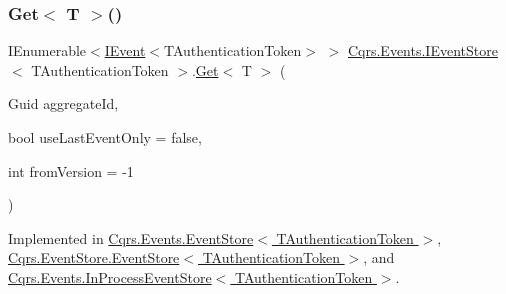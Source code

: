 \mbox{\label{interfaceCqrs_1_1Events_1_1IEventStore_add6227e2978ff8656aad79b1a51bf34c_add6227e2978ff8656aad79b1a51bf34c}} 
\subsubsection{\texorpdfstring{Get$<$ T $>$()}{Get< T >()}}
{\footnotesize\ttfamily I\+Enumerable$<$\hyperlink{interfaceCqrs_1_1Events_1_1IEvent}{I\+Event}$<$T\+Authentication\+Token$>$ $>$ \hyperlink{interfaceCqrs_1_1Events_1_1IEventStore}{Cqrs.\+Events.\+I\+Event\+Store}$<$ T\+Authentication\+Token $>$.\hyperlink{interfaceCqrs_1_1Events_1_1IEventStore_ae02ef6c804d0c4a92705a447bc4b2214_ae02ef6c804d0c4a92705a447bc4b2214}{Get}$<$ T $>$ (\begin{DoxyParamCaption}\item[{Guid}]{aggregate\+Id,  }\item[{bool}]{use\+Last\+Event\+Only = {\ttfamily false},  }\item[{int}]{from\+Version = {\ttfamily -\/1} }\end{DoxyParamCaption})}



Implemented in \hyperlink{classCqrs_1_1Events_1_1EventStore_aa6ffed5d7dd365600669149da29f9e89_aa6ffed5d7dd365600669149da29f9e89}{Cqrs.\+Events.\+Event\+Store$<$ T\+Authentication\+Token $>$}, \hyperlink{classCqrs_1_1EventStore_1_1EventStore_aaa4ebd61c84124425380ce31e3a67600_aaa4ebd61c84124425380ce31e3a67600}{Cqrs.\+Event\+Store.\+Event\+Store$<$ T\+Authentication\+Token $>$}, and \hyperlink{classCqrs_1_1Events_1_1InProcessEventStore_a425206c170ac3d000652dfdab181b340_a425206c170ac3d000652dfdab181b340}{Cqrs.\+Events.\+In\+Process\+Event\+Store$<$ T\+Authentication\+Token $>$}.

\mbox{\label{interfaceCqrs_1_1Events_1_1IEventStore_a81fb586703e7c6dea6b23d9a95f3887a_a81fb586703e7c6dea6b23d9a95f3887a}} 
